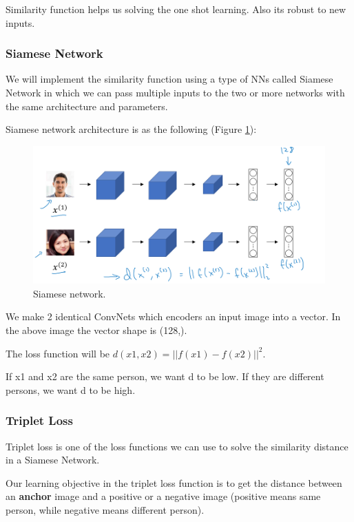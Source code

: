 Similarity function helps us solving the one shot learning. Also its robust to new inputs.

\subsubsection{Siamese Network}
We will implement the similarity function using a type of NNs called Siamese Network \cite{koch2015siamese} in which we can pass multiple inputs to the two or more networks with the same architecture and parameters.

Siamese network architecture is as the following (Figure \ref{siamese}):

\begin{figure}[!htbp]
    \centering
    \includegraphics[width=1.0\textwidth]{img/c4/siamese.png}
    \caption{Siamese network.}
    \label{siamese}
\end{figure}

We make 2 identical ConvNets which encoders an input image into a vector. In the above image the vector shape is (128,). 

The loss function will be $d(x1, x2) = ||f(x1) - f(x2)||^2$.

If x1 and x2 are the same person, we want d to be low. If they are different persons, we want d to be high.

\subsubsection{Triplet Loss}
Triplet loss is one of the loss functions we can use to solve the similarity distance in a Siamese Network.

Our learning objective in the triplet loss function is to get the distance between an \textbf{anchor} image and a positive or a negative image (positive means same person, while negative means different person).

